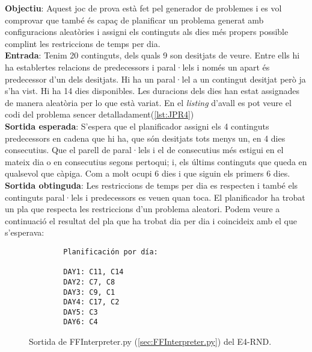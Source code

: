 \documentclass[a4paper]{article}
\begin{document}
	\noindent \textbf{Objectiu}: Aquest joc de prova està fet pel generador de problemes i es vol comprovar que també és capaç de planificar un problema generat amb configuracions aleatòries i assigni els continguts als dies més propers possible complint les restriccions de temps per dia.\\
	
	\noindent \textbf{Entrada}: Tenim 20 continguts, dels quals 9 son desitjats de veure. Entre ells hi ha establertes relacions de predecessors i paral·lels i només un apart és predecessor d'un dels desitjats. Hi ha un paral·lel a un contingut desitjat però ja s'ha vist. Hi ha 14 dies disponibles. Les duracions dels dies han estat assignades de manera aleatòria per lo que està variat. En el \textit{listing} d'avall es pot veure el codi del problema sencer detalladament(\ref{lst:JPR4})\\
	
	\noindent \textbf{Sortida esperada}: S'espera que el planificador assigni els 4 continguts predecessors en cadena que hi ha, que són desitjats tots menys un, en 4 dies consecutius. Que el parell de paral·lels i el de consecutius més estigui en el mateix dia o en consecutius segons pertoqui; i, els últims continguts que queda en qualsevol que càpiga. Com a molt ocupi 6 dies i que siguin els primers 6 dies.\\
	
	\noindent \textbf{Sortida obtinguda}: Les restriccions de temps per dia es respecten i també els continguts paral·lels i predecessors es veuen quan toca. El planificador ha trobat un pla que respecta les restriccions d'un problema aleatori.  Podem veure a continuació el resultat del pla que ha trobat dia per dia i coincideix amb el que s'esperava:\\
	
	\begin{figure}[H]
		\centering
		\begin{verbatim}
		Planificación por día:
		
		DAY1: C11, C14
		DAY2: C7, C8
		DAY3: C9, C1
		DAY4: C17, C2
		DAY5: C3
		DAY6: C4
		\end{verbatim}
		\caption{Sortida de FFInterpreter.py (\ref{sec:FFInterpreter.py}) del E4-RND.}
	\end{figure}
	
\end{document}
